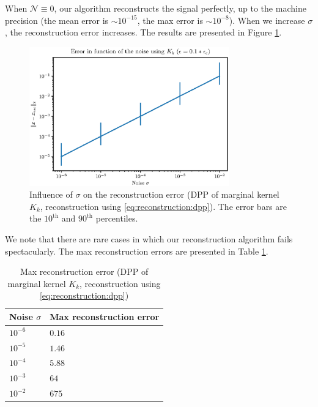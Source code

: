 \documentclass{article}
\begin{document}
When $\mathcal{N} \equiv 0$, our algorithm reconstructs the signal perfectly, up to the machine precision (the mean error is $\sim 10^{-15}$, the max error is $\sim 10^{-8}$). When we increase $\sigma$, the reconstruction error increases. The results are presented in Figure \ref{fig:Kk:recerror}.


\begin{figure}[ht]
\centering
\includegraphics[height=6cm]{error_function_noise_Kk.eps}
\caption{Influence of $\sigma$ on the reconstruction error (DPP of marginal kernel $K_k$, reconstruction using \eqref{eq:reconstruction:dpp}). The error bars are the $10^\text{th}$ and $90^\text{th}$ percentiles.} \label{fig:Kk:recerror}
\end{figure}


We note that there are rare cases in which our reconstruction algorithm fails spectacularly. The max reconstruction errors are presented in Table \ref{tab:Kk:maxrecerror}. 


\begin{table}[ht]
  \caption{Max reconstruction error (DPP of marginal kernel $K_k$, reconstruction using \eqref{eq:reconstruction:dpp})}
  \label{tab:Kk:maxrecerror}
  \centering
  \begin{tabular}{ll}
    \toprule
    Noise $\sigma$ &  Max reconstruction error \\
    \midrule
    $10^{-6}$ & $0.16$ \\
    $10^{-5}$ & $1.46$ \\
    $10^{-4}$ & $5.88$ \\
		$10^{-3}$ & $64$ \\
		$10^{-2}$ & $675$ \\
    \bottomrule
  \end{tabular}
\end{table}


\end{document}
